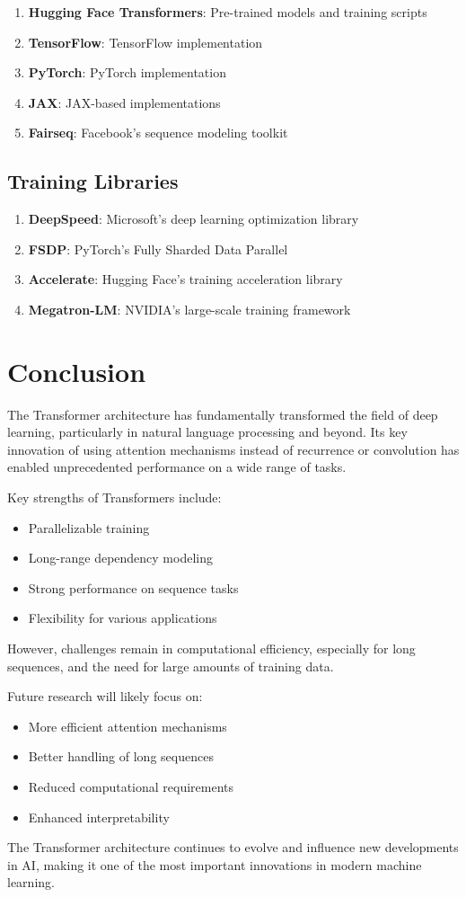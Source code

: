 \documentclass[11pt,a4paper]{article}
\begin{document}
\begin{enumerate}
\item \textbf{Hugging Face Transformers}: Pre-trained models and training scripts
\item \textbf{TensorFlow}: TensorFlow implementation
\item \textbf{PyTorch}: PyTorch implementation
\item \textbf{JAX}: JAX-based implementations
\item \textbf{Fairseq}: Facebook's sequence modeling toolkit
\end{enumerate}

\subsection{Training Libraries}

\begin{enumerate}
\item \textbf{DeepSpeed}: Microsoft's deep learning optimization library
\item \textbf{FSDP}: PyTorch's Fully Sharded Data Parallel
\item \textbf{Accelerate}: Hugging Face's training acceleration library
\item \textbf{Megatron-LM}: NVIDIA's large-scale training framework
\end{enumerate}

\section{Conclusion}

The Transformer architecture has fundamentally transformed the field of deep learning, particularly in natural language processing and beyond. Its key innovation of using attention mechanisms instead of recurrence or convolution has enabled unprecedented performance on a wide range of tasks.

Key strengths of Transformers include:
\begin{itemize}
\item Parallelizable training
\item Long-range dependency modeling
\item Strong performance on sequence tasks
\item Flexibility for various applications
\end{itemize}

However, challenges remain in computational efficiency, especially for long sequences, and the need for large amounts of training data.

Future research will likely focus on:
\begin{itemize}
\item More efficient attention mechanisms
\item Better handling of long sequences
\item Reduced computational requirements
\item Enhanced interpretability
\end{itemize}

The Transformer architecture continues to evolve and influence new developments in AI, making it one of the most important innovations in modern machine learning.
\end{document}
